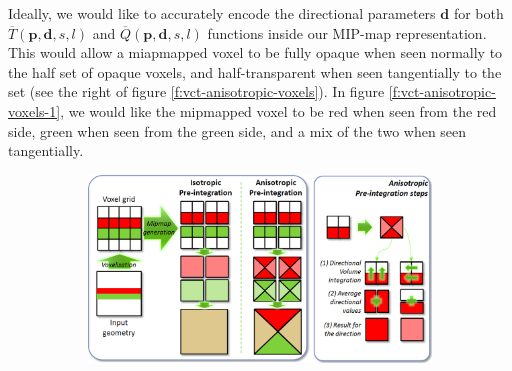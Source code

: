 Ideally, we would like to accurately encode the directional parameters $\mathbf{d}$ for both $\overline{T}(\mathbf{p},\mathbf{d},s,l)$ and $\overline{Q}(\mathbf{p},\mathbf{d},s,l)$ functions inside our MIP-map representation. This would allow a miapmapped voxel to be fully opaque when seen normally to the half set of opaque voxels, and half-transparent when seen tangentially to the set (see the right of figure \ref{f:vct-anisotropic-voxels}). In figure \ref{f:vct-anisotropic-voxels-1}, we would like the mipmapped voxel to be red when seen from the red side, green when seen from the green side, and a mix of the two when seen tangentially.

\begin{figure}\label{f:vct-anisotropic-voxels}
	\begin{subfigure}[b]{0.765\textwidth}
		\includegraphics{graphics/vct/vct-10-1}
	\end{subfigure}
	\begin{subfigure}[b]{0.215\textwidth}

\end{subfigure}
\end{figure}
